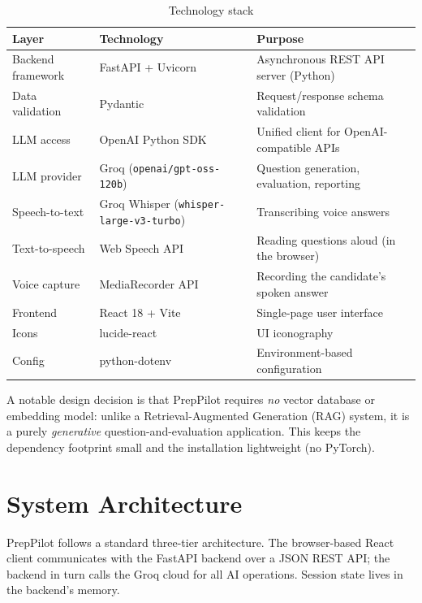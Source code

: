 \documentclass[11pt,a4paper]{article}
\newcommand{\code}[1]{\texttt{#1}}
\begin{document}
\begin{table}[h]
\centering
\renewcommand{\arraystretch}{1.25}
\begin{tabularx}{\textwidth}{@{}l l X@{}}
\toprule
\textbf{Layer} & \textbf{Technology} & \textbf{Purpose} \\
\midrule
Backend framework & FastAPI + Uvicorn & Asynchronous REST API server (Python) \\
Data validation   & Pydantic          & Request/response schema validation \\
LLM access        & OpenAI Python SDK & Unified client for OpenAI-compatible APIs \\
LLM provider      & Groq (\code{openai/gpt-oss-120b}) & Question generation, evaluation, reporting \\
Speech-to-text    & Groq Whisper (\code{whisper-large-v3-turbo}) & Transcribing voice answers \\
Text-to-speech    & Web Speech API    & Reading questions aloud (in the browser) \\
Voice capture     & MediaRecorder API & Recording the candidate's spoken answer \\
Frontend          & React 18 + Vite   & Single-page user interface \\
Icons             & lucide-react      & UI iconography \\
Config            & python-dotenv     & Environment-based configuration \\
\bottomrule
\end{tabularx}
\caption{Technology stack}
\end{table}

A notable design decision is that PrepPilot requires \emph{no} vector database or
embedding model: unlike a Retrieval-Augmented Generation (RAG) system, it is a purely
\emph{generative} question-and-evaluation application. This keeps the dependency
footprint small and the installation lightweight (no PyTorch).

\section{System Architecture}

PrepPilot follows a standard three-tier architecture. The browser-based React client
communicates with the FastAPI backend over a JSON REST API; the backend in turn calls
the Groq cloud for all AI operations. Session state lives in the backend's memory.
\end{document}
